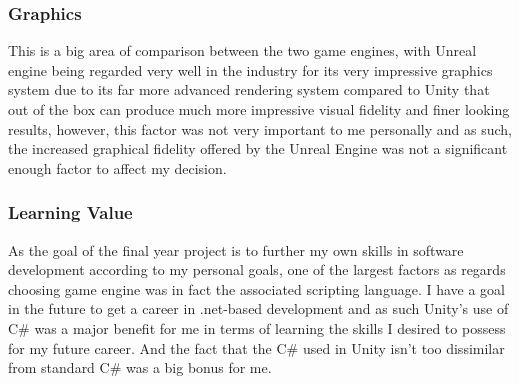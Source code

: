 \pagebreak
\subsubsection{Graphics}
This is a big area of comparison between the two game engines, with Unreal engine being regarded very well in the industry for its very impressive graphics system due to its far more advanced rendering system compared to Unity that out of the box can produce much more impressive visual fidelity and finer looking results, however, this factor was not very important to me personally and as such, the increased graphical fidelity offered by the Unreal Engine was not a significant enough factor to affect my decision.
\subsubsection{Learning Value}
As the goal of the final year project is to further my own skills in software development according to my personal goals, one of the largest factors as regards choosing game engine was in fact the associated scripting language. I have a goal in the future to get a career in .net-based development and as such Unity's use of C\# was a major benefit for me in terms of learning the skills I desired to possess for my future career. And the fact that the C\# used in Unity isn't too dissimilar from standard C\# was a big bonus for me.
